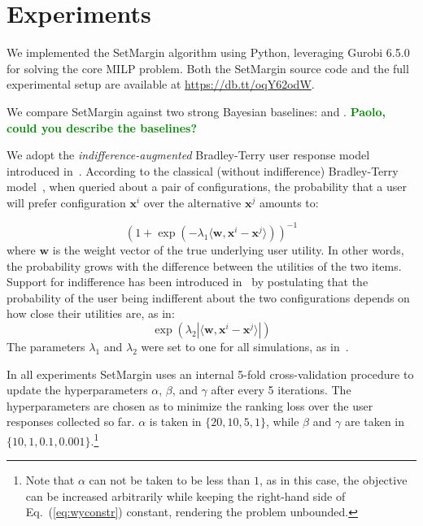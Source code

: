 \documentclass{article}
\renewcommand\[{\begin{equation}}
\renewcommand\]{\end{equation}}
\newcommand{\vecvar}[1]{\ensuremath{\boldsymbol{#1}}}
\newcommand{\vw}{\vecvar{w}}
\newcommand{\vx}{\vecvar{x}}
\newcommand{\stefano}[1]{{\bf \textcolor{green}{{\fbox{Stefano:} #1}}}}
\begin{document}
\section{Experiments}
\label{sec:experiments}

We implemented the {\sc SetMargin} algorithm using Python, leveraging Gurobi
6.5.0 for solving the core MILP problem. Both the {\sc SetMargin} source code
and the full experimental setup are available at \url{https://db.tt/oqY62odW}.

We compare {\sc SetMargin} against two strong Bayesian baselines:
\cite{guo2010real} and \cite{viappiani2010optimal}.
\stefano{Paolo, could you describe the baselines?}

We adopt the {\em indifference-augmented} Bradley-Terry user response
model introduced in~\cite{guo2010real}. According to the classical
(without indifference) Bradley-Terry model~\cite{BraTer52}, when queried about a pair
of configurations, the probability that a user will prefer
configuration $\vx^i$ over the alternative $\vx^j$ amounts to:

%
$$ (1 + \exp(-\lambda_1 \langle\vw,\vx^i - \vx^j\rangle))^{-1} $$
%
where $\vw$ is the weight vector of the true underlying user utility.
In other words, the probability grows with the difference between the
utilities of the two items. Support for indifference has been
introduced in~\cite{guo2010real} by postulating that the probability
of the user being indifferent about the two configurations depends on
how close their utilities are, as in:
%
$$ \exp(\lambda_2 |\langle\vw,\vx^i - \vx^j\rangle|) $$
%
The parameters $\lambda_1$ and $\lambda_2$ were set to one for all
simulations, as in~\cite{guo2010real}.

In all experiments {\sc SetMargin} uses an internal 5-fold cross-validation procedure to
update the hyperparameters $\alpha$, $\beta$, and $\gamma$ after every 5
iterations. The hyperparameters are chosen as to minimize the ranking loss over
the user responses collected so far. $\alpha$ is taken in $\{20, 10, 5, 1\}$,
while $\beta$ and $\gamma$ are taken in $\{10, 1, 0.1, 0.001\}$.\footnote{Note
that $\alpha$ can not be taken to be less than $1$, as in this case, the
objective can be increased arbitrarily while keeping the right-hand side of
Eq.~(\ref{eq:wyconstr}) constant, rendering the problem unbounded.}
\end{document}
